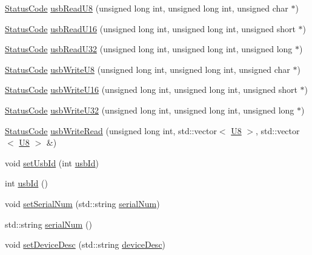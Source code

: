 \begin{DoxyCompactItemize}
\item 
\hyperlink{classStatusCode}{Status\+Code} \hyperlink{classUsbFTMLInterface_ac356419a8bbaa26e63f182a86e5fd380}{usb\+Read\+U8} (unsigned long int, unsigned long int, unsigned char $\ast$)
\item 
\hyperlink{classStatusCode}{Status\+Code} \hyperlink{classUsbFTMLInterface_a5fb608bce418671265b61266033cedc0}{usb\+Read\+U16} (unsigned long int, unsigned long int, unsigned short $\ast$)
\item 
\hyperlink{classStatusCode}{Status\+Code} \hyperlink{classUsbFTMLInterface_aa1256fc56698bc9ed1bcf11ecc6ff766}{usb\+Read\+U32} (unsigned long int, unsigned long int, unsigned long $\ast$)
\item 
\hyperlink{classStatusCode}{Status\+Code} \hyperlink{classUsbFTMLInterface_ae5cb7b250be9be23f90f455f57d41287}{usb\+Write\+U8} (unsigned long int, unsigned long int, unsigned char $\ast$)
\item 
\hyperlink{classStatusCode}{Status\+Code} \hyperlink{classUsbFTMLInterface_ab5c7e059f621774c6f51a1a7e9012aed}{usb\+Write\+U16} (unsigned long int, unsigned long int, unsigned short $\ast$)
\item 
\hyperlink{classStatusCode}{Status\+Code} \hyperlink{classUsbFTMLInterface_a79433fc9a3dd8c96519960cd55958fbf}{usb\+Write\+U32} (unsigned long int, unsigned long int, unsigned long $\ast$)
\item 
\hyperlink{classStatusCode}{Status\+Code} \hyperlink{classUsbFTMLInterface_ab3ae56cb732cbb8f38494cd3205a2650}{usb\+Write\+Read} (unsigned long int, std\+::vector$<$ \hyperlink{classUsbFTMLInterface_af7c9f02ee6f59fefa68ef14f90dcbbd8}{U8} $>$, std\+::vector$<$ \hyperlink{classUsbFTMLInterface_af7c9f02ee6f59fefa68ef14f90dcbbd8}{U8} $>$ \&)
\item 
void \hyperlink{classUsbFTMLInterface_a00dc58835d65f98593e15287c1c8c6ab}{set\+Usb\+Id} (int \hyperlink{classUsbFTMLInterface_a99016c7661780ed89195dc507d3516fc}{usb\+Id})
\item 
int \hyperlink{classUsbFTMLInterface_a99016c7661780ed89195dc507d3516fc}{usb\+Id} ()
\item 
void \hyperlink{classUsbFTMLInterface_a53fda4d42c82362f61544ba7c05beb8a}{set\+Serial\+Num} (std\+::string \hyperlink{classUsbFTMLInterface_a6b005503472f0ff0357662555275cba4}{serial\+Num})
\item 
std\+::string \hyperlink{classUsbFTMLInterface_a6b005503472f0ff0357662555275cba4}{serial\+Num} ()
\item 
void \hyperlink{classUsbFTMLInterface_a8be842aa510ff8f915a9ad31f11154a0}{set\+Device\+Desc} (std\+::string \hyperlink{classUsbFTMLInterface_ab541b4c57c1e7e947037acbfebc3fe3b}{device\+Desc})

\end{DoxyCompactItemize}

